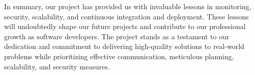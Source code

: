 \documentclass{article}
\begin{document}
In summary, our project has provided us with invaluable lessons in monitoring, security, scalability, and continuous integration and deployment. These lessons will undoubtedly shape our future projects and contribute to our professional growth as software developers. The project stands as a testament to our dedication and commitment to delivering high-quality solutions to real-world problems while prioritizing effective communication, meticulous planning, scalability, and security measures.

\nocite{*}
\newpage


\end{document}
